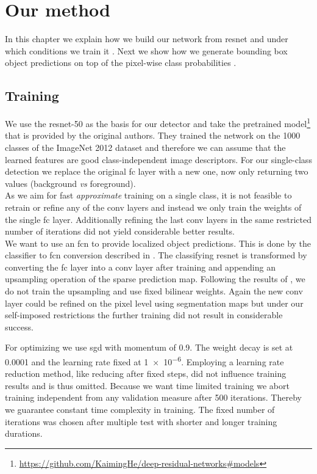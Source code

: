 %
\chapter{Our method}
\label{sec:pipeline}
In this chapter we explain how we build our network from \gls{resnet} and under which conditions we train it . Next we show how we generate bounding box object predictions on top of the pixel-wise class probabilities .

\section{Training}
\label{sec:pipeline:training}
We use the \gls{resnet}-50  as the basis for our detector and take the pretrained model\footnote{\url{https://github.com/KaimingHe/deep-residual-networks\#models}} that is provided by the original authors. They trained the network on the 1000 classes of the ImageNet 2012 dataset \citep{russakovsky_imagenet_2015} and therefore we can assume that the learned features are good class-independent image descriptors. For our single-class detection we replace the original \gls{fc} layer with a new one, now only returning two values (background \textit{vs} foreground).\\
As we aim for fast \textit{approximate} training on a single class, it is not feasible to retrain or refine any of the \gls{conv} layers and instead we only train the weights of the single \gls{fc} layer. Additionally refining the last \gls{conv} layers in the same restricted number of iterations did not yield considerable better results.\\
We want to use an \gls{fcn} to provide localized object predictions. This is done by the classifier to \gls{fcn} conversion described in . The classifying \gls{resnet} is transformed by converting the \gls{fc} layer into a \gls{conv} layer after training and appending an upsampling operation of the sparse prediction map. Following the results of \citep{shelhamer_fully_2016}, we do not train the upsampling and use fixed bilinear weights. Again the new \gls{conv} layer could be refined on the pixel level using segmentation maps but under our self-imposed restrictions the further training did not result in considerable success.

For optimizing we use \gls{sgd} with momentum of 0.9. The weight decay is set at 0.0001 and the learning rate fixed at \num{1e-6}. Employing a learning rate reduction method, like reducing after fixed steps, did not influence training results and is thus omitted. Because we want time limited training we abort training independent from any validation measure after 500 iterations. Thereby we guarantee constant time complexity in training. The fixed number of iterations was chosen after multiple test with shorter and longer training durations.

